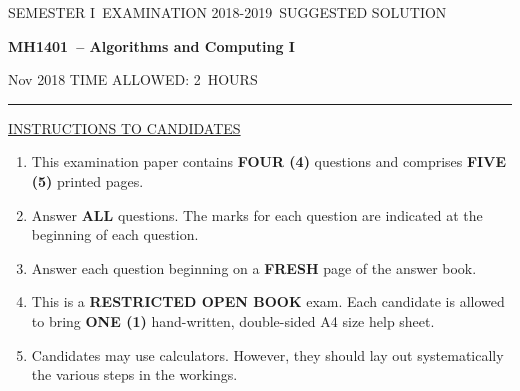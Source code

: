 \documentclass[12pt]{article}
\newcommand{\masunitnumber}{MH1401}
\newcommand{\examdate}{Nov 2018}
\newcommand{\academicyear}{2018-2019}
\newcommand{\semester}{I}
\newcommand{\coursename}{Algorithms and Computing I}
\newcommand{\numberofhours}{2}
\begin{document}
\setlength{\headsep}{5truemm}
\setlength{\headheight}{14.5truemm}
\setlength{\voffset}{-0.45truein}
\renewcommand{\headrulewidth}{0.0pt}
\begin{center}
SEMESTER \semester\ EXAMINATION \academicyear ~SUGGESTED SOLUTION
\end{center}
\begin{center}
{\bf \masunitnumber\ -- \coursename}
\end{center}
\vspace{20truemm}

\noindent \examdate\hspace{55truemm} TIME ALLOWED: \numberofhours\ HOURS

\vspace{19truemm}
\hrule
\vspace{19truemm}
\noindent\underline{INSTRUCTIONS TO CANDIDATES}
\vspace{8truemm}
\begin{enumerate}
\item This examination paper contains {\bf FOUR (4)} questions and comprises 
{\bf FIVE (5)} printed pages.

\item Answer {\bf ALL} questions. 
The marks for each question are indicated at the beginning of each question.


\item Answer each question beginning on a {\bf FRESH} page of the answer book.

\item This is a {\bf RESTRICTED OPEN BOOK} exam. Each candidate is allowed to bring {\bf ONE (1)} hand-written, double-sided A4 size help sheet.

\item Candidates may use calculators. However, they should lay out systematically the various steps in the workings.

\end{enumerate}

\newpage
\lhead{}
\rhead{\masunitnumber}
\chead{}
\lfoot{}
\cfoot{\thepage}
\rfoot{}
\setlength{\footskip}{45pt}
\iffalse
\noindent Solutions provided by:
Brandon Goh -- bgoh008@e.ntu.edu.sg
\fi
\end{document}
